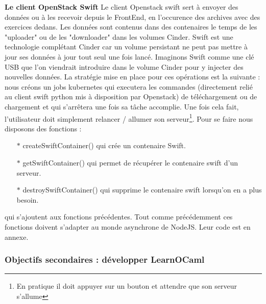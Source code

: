 \documentclass{article}
\begin{document}
\textbf{Le client OpenStack Swift}
\newline
\newline
Le client Openstack swift sert à envoyer des données ou à les recevoir depuis le FrontEnd, en l'occurence des archives avec des exercices dedans.
\newline
Les données sont contenus dans des contenaires le temps de les "uploader" ou de les "downloader" dans les volumes Cinder. Swift est une technologie complétant Cinder car un volume persistant ne peut pas mettre à jour ses données à jour tout seul une fois lancé. Imaginons Swift comme une clé USB que l'on viendrait introduire dans le volume Cinder pour y injecter des nouvelles données.
\newline
La stratégie mise en place pour ces opérations est la suivante : nous créons un jobs kubernetes qui executera les commandes (directement relié au client swift python mis à disposition par Openstack) de téléchargement ou de chargement et qui s'arrêtera une fois sa tâche accomplie. Une fois cela fait, l'utilisateur doit simplement relancer / allumer son serveur\footnote{En pratique il doit appuyer sur un bouton et attendre que son serveur s'allume}.
\newline
Pour se faire nous disposons des fonctions :
\begin{itemize}
	\item[$\ast$]createSwiftContainer() qui crée un contenaire Swift.
	\item[$\ast$]getSwiftContainer() qui permet de récupérer le contenaire swift d'un serveur.
	\item[$\ast$]destroySwiftContainer() qui supprime le contenaire swift lorsqu'on en a plus besoin.
\end{itemize}
qui s'ajoutent aux fonctions précédentes.
Tout comme précédemment ces fonctions doivent s'adapter au monde asynchrone de NodeJS.
Leur code est en annexe.
\newpage


\subsubsection{Objectifs secondaires : développer LearnOCaml}
\end{document}
